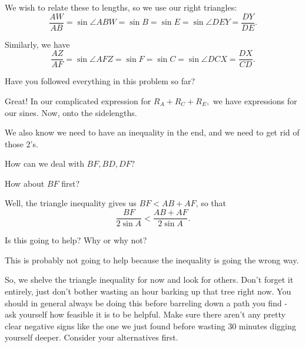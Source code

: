 We wish to relate these to lengths, so we use our right triangles: $$\frac{AW}{AB} = \sin \angle ABW = \sin B = \sin E = \sin \angle DEY = \frac{DY}{DE}.$$

Similarly, we have $$\frac{AZ}{AF} = \sin \angle AFZ = \sin F = \sin C = \sin \angle DCX = \frac{DX}{CD}.$$

Have you followed everything in this problem so far?





Great! In our complicated expression for $R_A + R_C + R_E,$ we have expressions for our sines. Now, onto the sidelengths.

We also know we need to have an inequality in the end, and we need to get rid of those 2's.

How can we deal with $BF, BD, DF?$

How about $BF$ first?

Well, the triangle inequality gives us $BF < AB + AF$, so that
$$\frac{BF}{2 \sin A} < \frac{AB + AF}{2 \sin A}.$$

Is this going to help?  Why or why not?



This is probably not going to help because the inequality is going the wrong way.

So, we shelve the triangle inequality for now and look for others.  Don't forget it entirely, just don't bother wasting an hour barking up that tree right now.  You should in general always be doing this before barreling down a path you find - ask yourself how feasible it is to be helpful.  Make sure there aren't any pretty clear negative signs like the one we just found before wasting 30 minutes digging yourself deeper.  Consider your alternatives first.

